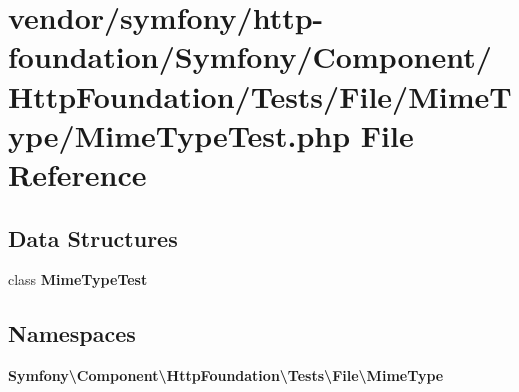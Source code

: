 \section{vendor/symfony/http-\/foundation/\+Symfony/\+Component/\+Http\+Foundation/\+Tests/\+File/\+Mime\+Type/\+Mime\+Type\+Test.php File Reference}
\label{_mime_type_test_8php}
\subsection*{Data Structures}
\begin{DoxyCompactItemize}
\item 
class {\bf Mime\+Type\+Test}
\end{DoxyCompactItemize}
\subsection*{Namespaces}
\begin{DoxyCompactItemize}
\item 
 {\bf Symfony\textbackslash{}\+Component\textbackslash{}\+Http\+Foundation\textbackslash{}\+Tests\textbackslash{}\+File\textbackslash{}\+Mime\+Type}
\end{DoxyCompactItemize}
